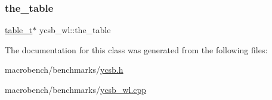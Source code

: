 \mbox{\label{classycsb__wl_a717e1db064d7069663e031231984c18e}} 
\subsubsection{\texorpdfstring{the\+\_\+table}{the\_table}}
{\footnotesize\ttfamily \hyperlink{classtable__t}{table\+\_\+t}$\ast$ ycsb\+\_\+wl\+::the\+\_\+table}



The documentation for this class was generated from the following files\+:\begin{DoxyCompactItemize}
\item 
macrobench/benchmarks/\hyperlink{ycsb_8h}{ycsb.\+h}\item 
macrobench/benchmarks/\hyperlink{ycsb__wl_8cpp}{ycsb\+\_\+wl.\+cpp}\end{DoxyCompactItemize}
